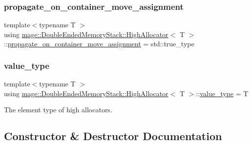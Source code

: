 \subsubsection{\texorpdfstring{propagate\+\_\+on\+\_\+container\+\_\+move\+\_\+assignment}{propagate\_on\_container\_move\_assignment}}
{\footnotesize\ttfamily template$<$typename T $>$ \\
using \mbox{\hyperlink{classmage_1_1_double_ended_memory_stack_1_1_high_allocator}{mage\+::\+Double\+Ended\+Memory\+Stack\+::\+High\+Allocator}}$<$ T $>$\+::\mbox{\hyperlink{classmage_1_1_double_ended_memory_stack_1_1_high_allocator_a56caf83353fdcc547233d5b2169c897c}{propagate\+\_\+on\+\_\+container\+\_\+move\+\_\+assignment}} =  std\+::true\+\_\+type}

\mbox{\label{classmage_1_1_double_ended_memory_stack_1_1_high_allocator_aa1286d55a0e3d5a8cf281d5d29b0f058}} 
\subsubsection{\texorpdfstring{value\+\_\+type}{value\_type}}
{\footnotesize\ttfamily template$<$typename T $>$ \\
using \mbox{\hyperlink{classmage_1_1_double_ended_memory_stack_1_1_high_allocator}{mage\+::\+Double\+Ended\+Memory\+Stack\+::\+High\+Allocator}}$<$ T $>$\+::\mbox{\hyperlink{classmage_1_1_double_ended_memory_stack_1_1_high_allocator_aa1286d55a0e3d5a8cf281d5d29b0f058}{value\+\_\+type}} =  T}

The element type of high allocators. 

\subsection{Constructor \& Destructor Documentation}
\mbox{\label{classmage_1_1_double_ended_memory_stack_1_1_high_allocator_ac1cb29fb8c7e53f90fd05d0c2feeb6a8}} 
